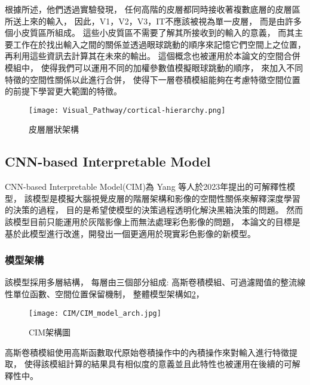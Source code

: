 \documentclass[class=NCU_thesis, crop=false]{standalone}
\begin{document}

\pagebreak
根據\cite{10.5555993636}所述，他們透過實驗發現，
任何高階的皮層都同時接收著複數底層的皮層區所送上來的輸入，
因此，V1，V2，V3，IT不應該被視為單一皮層，
而是由許多個小皮質區所組成。
這些小皮質區不需要了解其所接收到的輸入的意義，
而其主要工作在於找出輸入之間的關係並透過眼球跳動的順序來記憶它們空間上之位置，
再利用這些資訊去計算其在未來的輸出。
這個概念也被運用於本論文的空間合併模組中，
使得我們可以運用不同的加權參數值模擬眼球跳動的順序，
來加入不同特徵的空間性關係以此進行合併，
使得下一層卷積模組能夠在考慮特徵空間位置的前提下學習更大範圍的特徵。

\begin{figure}[H]
  \centering
  \texttt{[image: Visual\_Pathway/cortical-hierarchy.png]}
  \caption{皮層層狀架構~\cite{10.5555993636}}
  \label{fig:CorticalHierarchy}
\end{figure}
\pagebreak


\subsection{CNN-based Interpretable Model}
CNN-based Interpretable Model(CIM)\cite{YangCNNInterpretable}為 Yang 等人於2023年提出的可解釋性模型，
該模型是模擬大腦視覺皮層的階層架構和影像的空間性關係來解釋深度學習的決策的過程，
目的是希望使模型的決策過程透明化解決黑箱決策的問題。
然而該模型目前只能運用於灰階影像上而無法處理彩色影像的問題，
本論文的目標是基於此模型進行改進，開發出一個更適用於現實彩色影像的新模型。

\subsubsection{模型架構}
該模型採用多層結構，
每層由三個部分組成: 高斯卷積模組、可過濾閥值的整流線性單位函數、空間位置保留機制，
整體模型架構如\cref{fig:CIM_arch}，
\begin{figure}[H]
  \centering
  \texttt{[image: CIM/CIM\_model\_arch.jpg]}
  \caption{CIM架構圖~\cite{YangCNNInterpretable}}
  \label{fig:CIM_arch}
\end{figure}


高斯卷積模組使用高斯函數取代原始卷積操作中的內積操作來對輸入進行特徵提取，
使得該模組計算的結果具有相似度的意義並且此特性也被運用在後續的可解釋性中。\\
\end{document}
